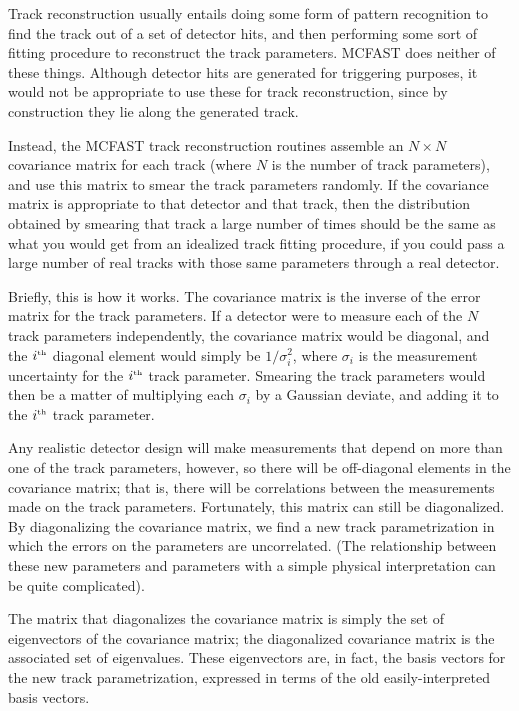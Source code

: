 Track reconstruction usually entails doing some form of pattern recognition
to find the track out of a set of detector hits, and then performing some
sort of fitting procedure to reconstruct the track parameters.  MCFAST does
neither of these things.  Although detector hits are generated for triggering
purposes, it would not be appropriate to use these for track reconstruction,
since by construction they lie along the generated track.

Instead, the MCFAST track reconstruction routines assemble an $N \times N$
covariance matrix for each track (where $N$ is the number of track
parameters), and use this matrix to smear the track parameters randomly.  If
the covariance matrix is appropriate to that detector and that track, then
the distribution obtained by smearing that track a large number of times
should be the same as what you would get from an idealized track fitting
procedure, if you could pass a large number of real tracks with those same
parameters through a real detector.

Briefly, this is how it works.  The covariance matrix is the inverse of the
error matrix for the track parameters.  If a detector were to measure each of
the $N$ track parameters independently, the covariance matrix would be
diagonal, and the $i^{\rm\scriptscriptstyle th}$ diagonal element would simply be
$1/\sigma^2_i$, where $\sigma_i$ is the measurement uncertainty for the
$i^{\rm\scriptscriptstyle th}$ track parameter.  Smearing the track parameters would then be
a matter of multiplying each $\sigma_i$ by a Gaussian deviate, and adding it
to the $i^{\rm\scriptscriptstyle th}$ track parameter.

Any realistic detector design will make measurements that depend on more than
one of the track parameters, however, so there will be off-diagonal elements
in the covariance matrix; that is, there will be correlations between the
measurements made on the track parameters.  Fortunately, this matrix can
still be diagonalized.  By diagonalizing the covariance matrix, we find a new
track parametrization in which the errors on the parameters are uncorrelated.
(The relationship between these new parameters and parameters with a simple
physical interpretation can be quite complicated).

The matrix that diagonalizes the covariance matrix is simply the set of
eigenvectors of the covariance matrix; the diagonalized covariance matrix is
the associated set of eigenvalues.  These eigenvectors are, in fact, the
basis vectors for the new track parametrization, expressed in terms of the
old easily-interpreted basis vectors.


